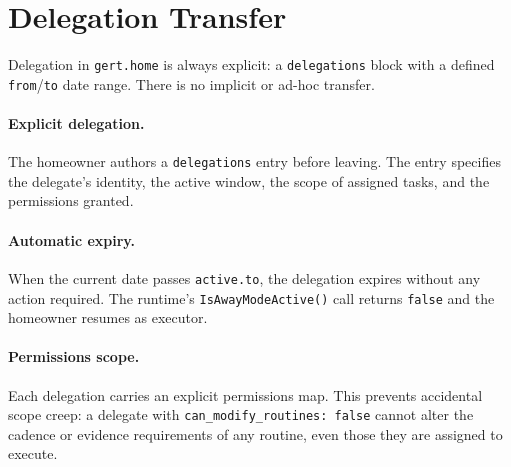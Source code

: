 \section{Delegation Transfer}
\label{sec:concepts-transfer}

Delegation in \texttt{gert.home} is always explicit: a \texttt{delegations} block with a
defined \texttt{from}/\texttt{to} date range. There is no implicit or ad-hoc transfer.

\paragraph{Explicit delegation.}
The homeowner authors a \texttt{delegations} entry before leaving. The entry specifies the
delegate's identity, the active window, the scope of assigned tasks, and the permissions
granted.

\paragraph{Automatic expiry.}
When the current date passes \texttt{active.to}, the delegation expires without any action
required. The runtime's \texttt{IsAwayModeActive()} call returns \texttt{false} and the
homeowner resumes as executor.

\paragraph{Permissions scope.}
Each delegation carries an explicit permissions map. This prevents accidental scope creep:
a delegate with \texttt{can\_modify\_routines: false} cannot alter the cadence or evidence
requirements of any routine, even those they are assigned to execute.
